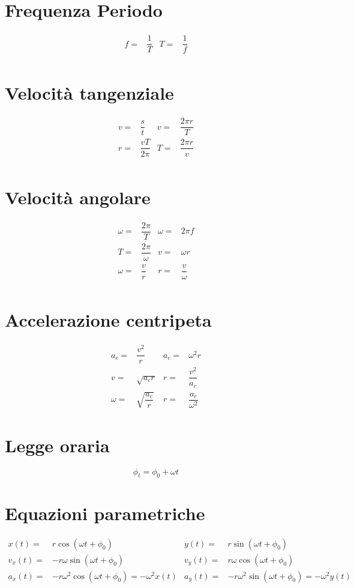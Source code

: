 \section{Frequenza Periodo}
\begin{align*}
f=&\dfrac{1}{T}&
T=&\dfrac{1}{f}\\
\end{align*}
\section{Velocità tangenziale}
\begin{align*}
v=&\dfrac{s}{t}&
v=&\dfrac{2\pi r}{T}\\
r=&\dfrac{vT}{2\pi}&
T=&\dfrac{2\pi r}{v}\\
\end{align*}
\section{Velocità angolare}
\begin{align*}
\omega=&\dfrac{2\pi}{T}&
\omega=&2\pi f\\
T=&\dfrac{2\pi}{\omega}&
v=&\omega r\\
\omega=&\dfrac{v}{r}&
r=&\dfrac{v}{\omega}\\
\end{align*}
\section{Accelerazione centripeta}
\begin{align*}
a_c=&\dfrac{v^2}{r}&
a_c=&\omega^2 r\\
v=&\sqrt{a_c r}&
r=&\dfrac{v^2}{a_c}\\
\omega=&\sqrt{\dfrac{a_c}{r}}&
r=&\dfrac{a_c}{\omega^2}
\end{align*}
\section{Legge oraria}
\begin{equation*}
\phi_t=\phi_0+\omega t
\end{equation*}
\section{Equazioni parametriche}
\begin{align*}
x(t)=&r\cos(\omega t+\phi_0)&
y(t)=&r\sin(\omega t+\phi_0)\\
v_x(t)=&-r\omega\sin(\omega t+\phi_0)&
v_y(t)=&r\omega\cos(\omega t+\phi_0)\\
a_x(t)=&-r\omega^2\cos(\omega t+\phi_0)=-\omega^2 x(t)&
a_y(t)=&-r\omega^2\sin(\omega t+\phi_0)=-\omega^2 y(t)\\
\end{align*}